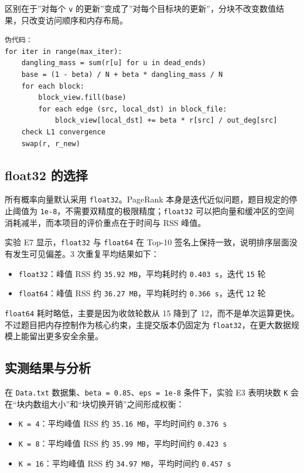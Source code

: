\documentclass[UTF8,a4paper,12pt]{ctexart}
\begin{document}
区别在于”对每个 \texttt{v} 的更新”变成了”对每个目标块的更新”，分块不改变数值结果，只改变访问顺序和内存布局。


\begin{lstlisting}
伪代码：
for iter in range(max_iter):
    dangling_mass = sum(r[u] for u in dead_ends)
    base = (1 - beta) / N + beta * dangling_mass / N
    for each block:
        block_view.fill(base)
        for each edge (src, local_dst) in block_file:
            block_view[local_dst] += beta * r[src] / out_deg[src]
    check L1 convergence
    swap(r, r_new)
\end{lstlisting}


\subsection{float32 的选择}


所有概率向量默认采用 \texttt{float32}。PageRank 本身是迭代近似问题，题目规定的停止阈值为 \texttt{1e-8}，不需要双精度的极限精度；\texttt{float32} 可以把向量和缓冲区的空间消耗减半，而本项目的评价重点在于时间与 RSS 峰值。


实验 E7 显示，\texttt{float32} 与 \texttt{float64} 在 Top-10 签名上保持一致，说明排序层面没有发生可见偏差。3 次重复平均结果如下：


\begin{itemize}
\item \texttt{float32}：峰值 RSS 约 \texttt{35.92 MB}，平均耗时约 \texttt{0.403 s}，迭代 \texttt{15} 轮
\item \texttt{float64}：峰值 RSS 约 \texttt{36.27 MB}，平均耗时约 \texttt{0.366 s}，迭代 \texttt{12} 轮
\end{itemize}


\texttt{float64} 耗时略低，主要是因为收敛轮数从 15 降到了 12，而不是单次运算更快。不过题目把内存控制作为核心约束，主提交版本仍固定为 \texttt{float32}，在更大数据规模上能留出更多安全余量。


\subsection{实测结果与分析}


在 \texttt{Data.txt} 数据集、\texttt{beta = 0.85}、\texttt{eps = 1e-8} 条件下，实验 E3 表明块数 \texttt{K} 会在“块内数组大小”和“块切换开销”之间形成权衡：


\begin{itemize}
\item \texttt{K = 4}：平均峰值 RSS 约 \texttt{35.16 MB}，平均时间约 \texttt{0.376 s}
\item \texttt{K = 8}：平均峰值 RSS 约 \texttt{35.99 MB}，平均时间约 \texttt{0.423 s}
\item \texttt{K = 16}：平均峰值 RSS 约 \texttt{34.97 MB}，平均时间约 \texttt{0.457 s}
\end{itemize}
\end{document}
